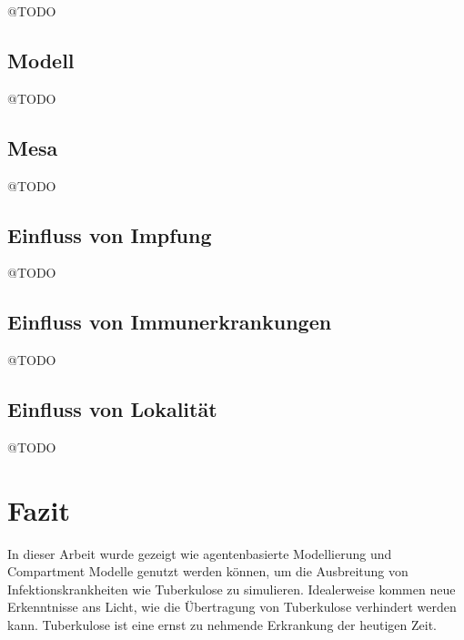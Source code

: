 \documentclass[paper=a4, fontsize=11pt, ngerman, abstract=on]{scrartcl}
\numberwithin{equation}{section} %
\numberwithin{figure}{section} %
\numberwithin{table}{section} %
\begin{document}
@TODO

\subsection{Modell}

@TODO

\subsection{Mesa}

@TODO

\subsection{Einfluss von Impfung}

@TODO

\subsection{Einfluss von Immunerkrankungen}

@TODO

\subsection{Einfluss von Lokalität}

@TODO

\section{Fazit}

In dieser Arbeit wurde gezeigt wie agentenbasierte Modellierung und Compartment Modelle genutzt werden können, um die Ausbreitung von Infektionskrankheiten wie Tuberkulose zu simulieren. Idealerweise kommen neue Erkenntnisse ans Licht, wie die Übertragung von Tuberkulose verhindert werden kann. Tuberkulose ist eine ernst zu nehmende Erkrankung der heutigen Zeit.

\newpage



\end{document}
